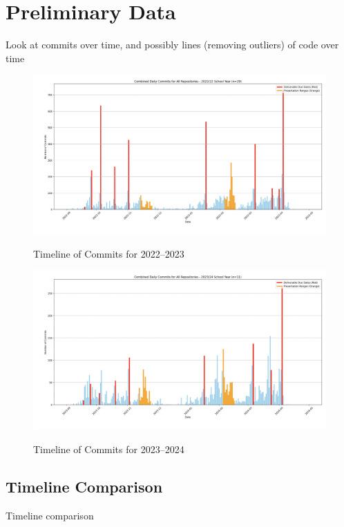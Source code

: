 \documentclass[10pt, conference]{IEEEtran}
\begin{document}
\section{Preliminary Data} \label{SecPrelimData}

Look at commits over time, and possibly lines (removing outliers) of code over
time

\begin{figure}[h!]
\begin{center}
{
     \includegraphics[width=0.75\columnwidth]{./figures/Yr22_23_DailyCommitsTimeline.png}
}
\caption{\label{Fig_22_23Timeline} Timeline of Commits for 2022--2023}
\end{center}
\end{figure}
  
\begin{figure}[h!]
\begin{center}
{
     \includegraphics[width=0.75\columnwidth]{./figures/Yr23_24_DailyCommitsTimeline.png}
}
\caption{\label{Fig_23_24Timeline} Timeline of Commits for 2023--2024}
\end{center}
\end{figure}

\subsection{Timeline Comparison}

Timeline comparison
\end{document}
